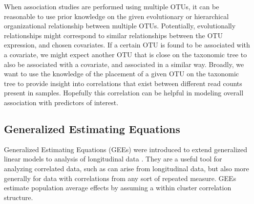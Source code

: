 \documentclass[12pt]{article}
\begin{document}
When association studies are performed using multiple OTUs, it can be reasonable to use prior knowledge on the given evolutionary or hierarchical organizational relationship between multiple OTUs. Potentially, evolutionally relationships might correspond to similar relationships between the OTU expression, and chosen covariates. If a certain OTU is found to be associated with a covariate, we might expect another OTU that is close on the taxonomic tree to   also be associated with a covariate, and associated in a similar way. Broadly, we want to use the knowledge of the placement of a given OTU on the taxonomic tree to provide insight into correlations that exist between different read counts present in samples. Hopefully this correlation can be helpful in modeling overall association with predictors of interest.





\subsection{Generalized Estimating Equations}

Generalized Estimating Equations (GEEs) were introduced to extend generalized linear models to analysis of longitudinal data \cite{liang1986longitudinal}. They are a useful tool for analyzing correlated data, such as can arise from longitudinal data, but also more generally for data with correlations from any sort of repeated measure. GEEs estimate population average effects by assuming a within cluster correlation structure.



\end{document}
